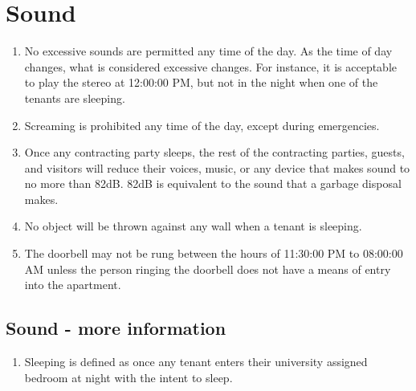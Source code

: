\documentclass[10pt]{article}
\begin{document}
\section{Sound}
\begin{enumerate}
	\item No excessive sounds are permitted any time of the day. As the time of day changes, what is considered excessive changes. For instance, it is acceptable to play the stereo at 12:00:00 PM, but not in the night when one of the tenants are sleeping.
	\item Screaming is prohibited any time of the day, except during emergencies.
	\item Once any contracting party sleeps, the rest of the contracting parties, guests, and visitors will reduce their voices, music, or any device that makes sound to no more than 82dB. 82dB is equivalent to the sound that a garbage disposal makes.
	\item No object will be thrown against any wall when a tenant is sleeping.
	\item The doorbell may not be rung between the hours of 11:30:00 PM to 08:00:00 AM unless the person ringing the doorbell does not have a means of entry into the apartment.
	
\end{enumerate}
\subsection{Sound - more information}
\begin{enumerate}
	\item Sleeping is defined as once any tenant enters their university assigned bedroom at night with the intent to sleep.
\end{enumerate}
\end{document}

